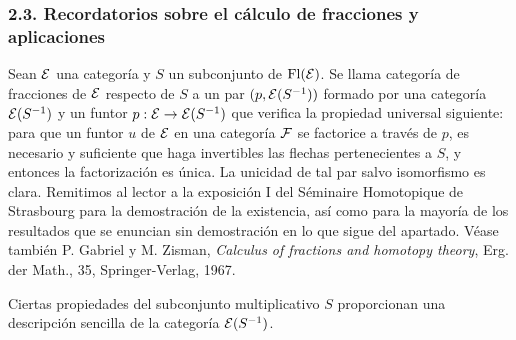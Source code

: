 \subsubsection*{2.3. Recordatorios sobre el cálculo de fracciones y aplicaciones}
Sean $\mathcal E$ una categoría y $S$ un subconjunto de $\operatorname{Fl}(\mathcal E)$. Se llama categoría de fracciones de $\mathcal E$ respecto de $S$ a un par $(p,\mathcal E(S^{-1}))$ formado por una categoría $\mathcal E(S^{-1})$ y un funtor $p:\mathcal E\to\mathcal E(S^{-1})$ que verifica la propiedad universal siguiente: para que un funtor $u$ de $\mathcal E$ en una categoría $\mathcal F$ se factorice a través de $p$, es necesario y suficiente que haga invertibles las flechas pertenecientes a $S$, y entonces la factorización es única. La unicidad de tal par salvo isomorfismo es clara. Remitimos al lector a la exposición I del Séminaire Homotopique de Strasbourg para la demostración de la existencia, así como para la mayoría de los resultados que se enuncian sin demostración en lo que sigue del apartado. Véase también P. Gabriel y M. Zisman, \emph{Calculus of fractions and homotopy theory}, Erg. der Math., 35, Springer-Verlag, 1967.

Ciertas propiedades del subconjunto multiplicativo $S$ proporcionan una descripción sencilla de la categoría $\mathcal E(S^{-1})$.

